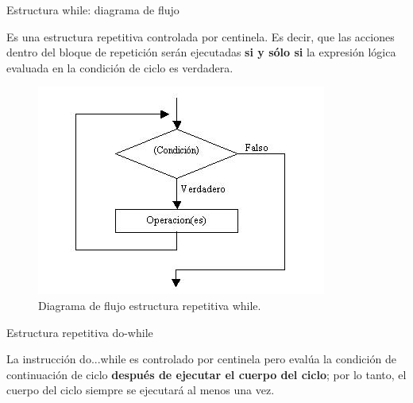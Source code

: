 \documentclass[xcolor=pdftex,table,11pt]{beamer}
\begin{document}
\begin{frame}{Estructura while: diagrama de flujo}

 \begin{block}{}
 Es una estructura repetitiva controlada por centinela. Es decir, que las acciones dentro del bloque de repetición serán ejecutadas \textbf{si y sólo si} la expresión lógica evaluada en la condición de ciclo es verdadera. 
\end{block}
 \begin{figure}
 \centering
\includegraphics[scale=0.5]{../img/exported/while.jpg}
\caption{Diagrama de flujo estructura repetitiva while.}
\end{figure}
\end{frame}

\begin{frame}
\codesetstylefrombeamer
{}
\end{frame}




\begin{frame}{Estructura repetitiva do-while}
\begin{block}{}
La instrucción do...while es controlado por centinela pero evalúa la condición de continuación de ciclo \textbf{después de ejecutar el cuerpo del ciclo}; por lo tanto, el cuerpo del ciclo siempre se ejecutará al menos una vez.
\end{block}

\end{frame}
\end{document}

